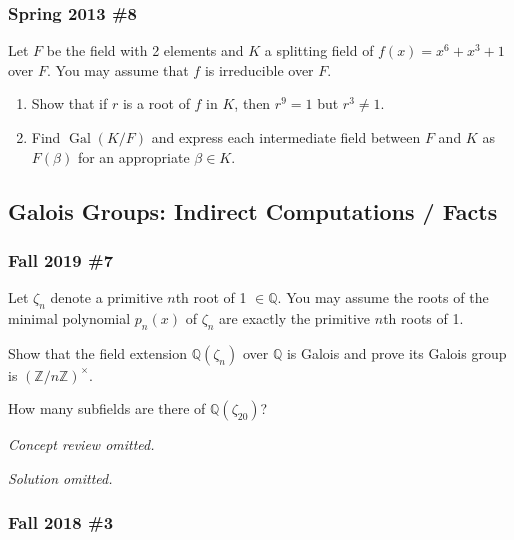 \hypertarget{spring-2013-8}{%
\subsubsection{Spring 2013 \#8}\label{spring-2013-8}}

Let \(F\) be the field with 2 elements and \(K\) a splitting field of
\(f(x) = x^6 + x^3 + 1\) over \(F\). You may assume that \(f\) is
irreducible over \(F\).

\begin{enumerate}
\def\labelenumi{\alph{enumi}.}
\item
  Show that if \(r\) is a root of \(f\) in \(K\), then \(r^9 = 1\) but
  \(r^3\neq 1\).
\item
  Find \({ \operatorname{Gal}} (K/F)\) and express each intermediate
  field between \(F\) and \(K\) as \(F(\beta)\) for an appropriate
  \(\beta \in K\).
\end{enumerate}

\hypertarget{galois-groups-indirect-computations-facts}{%
\subsection{Galois Groups: Indirect Computations /
Facts}\label{galois-groups-indirect-computations-facts}}

\hypertarget{fall-2019-7}{%
\subsubsection{Fall 2019 \#7}\label{fall-2019-7}}

Let \(\zeta_n\) denote a primitive \(n\)th root of 1
\(\in {\mathbb{Q}}\). You may assume the roots of the minimal polynomial
\(p_n(x)\) of \(\zeta_n\) are exactly the primitive \(n\)th roots of 1.

Show that the field extension \({\mathbb{Q}}(\zeta_n )\) over
\({\mathbb{Q}}\) is Galois and prove its Galois group is
\(({\mathbb{Z}}/n{\mathbb{Z}})^{\times}\).

How many subfields are there of \({\mathbb{Q}}(\zeta_{20} )\)?

\emph{Concept review omitted.}

\emph{Solution omitted.}

\hypertarget{fall-2018-3}{%
\subsubsection{Fall 2018 \#3}\label{fall-2018-3}}


